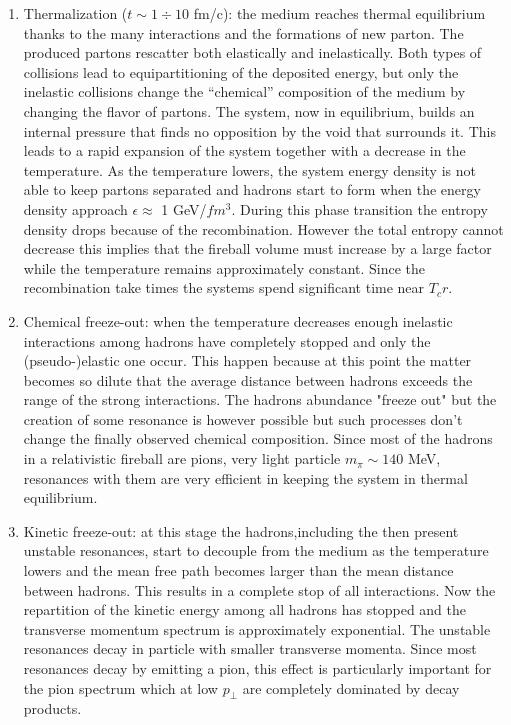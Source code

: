 \documentclass[12pt,a4paper]{book}
\begin{document}
\begin{enumerate}
		\item  Thermalization ($t \sim 1 \div10$ fm/c): the medium reaches thermal equilibrium thanks to the many interactions and the formations of new parton. The produced partons rescatter both elastically and inelastically. Both types of collisions lead to equipartitioning of the deposited energy, but only the inelastic collisions change the “chemical” composition of the medium by changing the flavor of partons. The system, now in equilibrium, builds an internal pressure that finds no opposition by the void that surrounds it. This leads to a rapid expansion of the system together with a decrease in the temperature. As the temperature lowers, the system energy density is not able to keep partons separated and hadrons start to form when the energy density approach $\epsilon \approx$  1 GeV/$fm^3$. During this phase transition the entropy density drops because of the recombination. However the total entropy cannot decrease this implies that the fireball volume must increase by a large factor while the temperature remains approximately constant. Since the recombination take times the systems spend significant time near $T_cr$.
		
		\item Chemical freeze-out: when the temperature decreases enough inelastic interactions among hadrons have completely stopped and only the (pseudo-)elastic one occur. This happen because at this point the matter becomes so dilute that the average distance between hadrons exceeds the range of the strong interactions. The hadrons abundance "freeze out" but the creation of some resonance is however possible but such processes don’t change the finally observed chemical composition. Since most of the	hadrons in a relativistic fireball are pions, very light particle $m_\pi \sim 140$ MeV, resonances with them are very efficient in keeping the system in thermal equilibrium.
		
		\item Kinetic freeze-out: at this stage the hadrons,including the then present unstable resonances, start to decouple from the medium as the temperature lowers and the mean free path becomes larger than the mean distance	between hadrons. This results in a complete stop of all interactions. Now the repartition of the kinetic energy among all hadrons has stopped and	the transverse momentum spectrum is approximately exponential. The unstable resonances decay in particle with smaller transverse momenta. Since most resonances decay by emitting a pion, this effect is particularly important for the pion spectrum which at low $p_\perp$ are completely dominated by decay products. 
		
	\end{enumerate}
\end{document}
